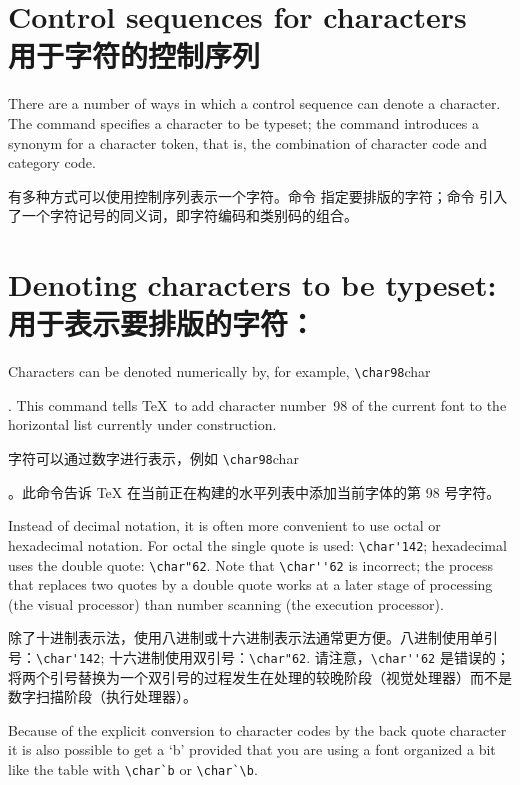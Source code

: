 \section{Control sequences for characters\\用于字符的控制序列}

There are a number of ways in which a control sequence can denote
a character. The  command specifies a character to be
typeset; the  command introduces
a synonym for a character token, that is,
the combination of character code and category code.

有多种方式可以使用控制序列表示一个字符。命令  指定要排版的字符；命令  引入了一个字符记号的同义词，即字符编码和类别码的组合。

\section{Denoting characters to be typeset: \protect{}\\用于表示要排版的字符：\protect{}}

Characters can be denoted numerically by, for example,
\verb.\char98.\cstoidx char\par.
This command tells \TeX\ to add character number~98 of the
current font to the horizontal list currently under construction.

字符可以通过数字进行表示，例如 \verb.\char98.\cstoidx char\par。此命令告诉 \TeX{} 在当前正在构建的水平列表中添加当前字体的第 98 号字符。

Instead of decimal notation, it is often more convenient to
use octal or hexadecimal notation. For octal the single quote is used:
\verb.\char'142.; hexadecimal uses the double quote: \verb.\char"62..
Note that \verb.\char''62. is incorrect; the process that replaces
two quotes by a double quote works at a later stage of processing
(the visual processor) than number scanning (the execution processor).

除了十进制表示法，使用八进制或十六进制表示法通常更方便。八进制使用单引号：\verb.\char'142.; 十六进制使用双引号：\verb.\char"62.. 请注意，\verb.\char''62. 是错误的；将两个引号替换为一个双引号的过程发生在处理的较晚阶段（视觉处理器）而不是数字扫描阶段（执行处理器）。

Because of the explicit conversion to character codes by the
back quote character it is also possible to get a `b' \ldash provided
that you are using a font organized a bit like the \ascii{} table \rdash
with \verb.\char`b.  or \verb.\char`\b..


